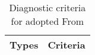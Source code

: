 
\begin{table}[htbp]
    \centering
    \label{tab:diagnostic_criteria}
    \begin{tabular}{ll}
        \toprule
        \textbf{Types } & \textbf{Criteria} \\
        \midrule
        
        \bottomrule
    \end{tabular}
    \caption{Diagnostic criteria for adopted From \cite{chauhan2022commentary}}
\end{table}
